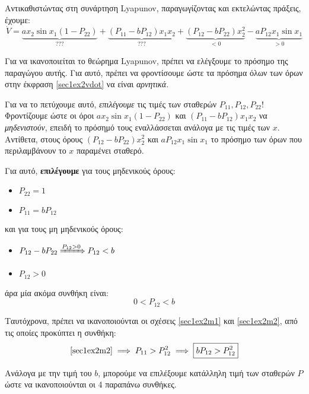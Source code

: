 \documentclass[11pt,a4paper,notitlepage,fleqn]{article}
\begin{document}
\begin{exercise}
	Αντικαθιστώντας στη συνάρτηση Lyapunov, παραγωγίζοντας και εκτελώντας πράξεις, έχουμε:
	\begin{equation}
	\dot V =
	\underbrace{ax_2\sin x_1\left( 1-P_{22} \right)}_{???} + \underbrace{(P_{11} - bP_{12})x_1x_2}_{???}
	+ \underbrace{(P_{12}-bP_{22})x_2^2}_{<0} -\underbrace{aP_{12}x_1\sin x_1}_{>0}
	\label{sec1ex2vdot}
	\end{equation}
	
	Για να ικανοποιείται το θεώρημα Lyapunov, πρέπει να ελέγξουμε το πρόσημο της
	παραγώγου αυτής. Για αυτό, πρέπει να φροντίσουμε ώστε τα πρόσημα όλων των
	όρων στην έκφραση \eqref{sec1ex2vdot} να είναι \textit{αρνητικά}.
	
	Για να το πετύχουμε αυτό, \textit{επιλέγουμε} τις τιμές των σταθερών
	\( P_{11},P_{12},P_{22} \)! Φροντίζουμε ώστε οι όροι \( ax_2\sin x_1(1-P_{22}) \)
	και \( (P_{11}-bP_{12})x_1x_2 \) να \textit{μηδενιστούν}, επειδή το πρόσημό τους
	εναλλάσσεται ανάλογα με τις τιμές των \( x \). Αντίθετα, στους όρους
	\( (P_{12}-bP_{22})x_2^2 \) και \( aP_{12}x_1\sin x_1 \) το πρόσημο των όρων
	που περιλαμβάνουν το \( x \) παραμένει σταθερό.
	
	Για αυτό, \textbf{επιλέγουμε} για τους μηδενικούς όρους:
	\begin{itemize}
		\item \( \boxed{P_{22} = 1 }\)
		\item \( \boxed{P_{11} = bP_{12}} \)
	\end{itemize}
	και για τους μη μηδενικούς όρους:
	\begin{itemize}
		\item \( P_{12} - bP_{22} \xRightarrow{P_{12} > 0} P_{12} < b \)
		\item \( P_{12} > 0 \)
	\end{itemize}
	άρα μία ακόμα συνθήκη είναι:
	\[
	\boxed{0 < P_{12} < b}
	\]
	
	Ταυτόχρονα, πρέπει να ικανοποιούνται οι σχέσεις \eqref{sec1ex2m1} και \eqref{sec1ex2m2}, από τις οποίες προκύπτει η συνθήκη:
	\[
	\eqref{sec1ex2m2} \implies P_{11} > P_{12}^2
	\implies \boxed{bP_{12} > P_{12}^2}
	\]
	
	Ανάλογα με την τιμή του \( b \), μπορούμε να επιλέξουμε κατάλληλη τιμή των
	σταθερών \( P \) ώστε να ικανοποιούνται οι 4 παραπάνω συνθήκες.
\end{exercise}
\end{document}
